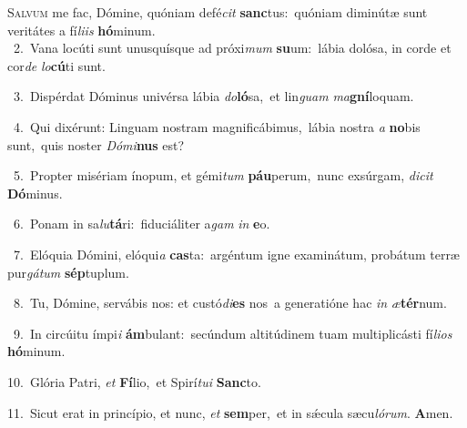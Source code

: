 \lettrine{\initial\textcolor{\initialcolor}{S}}{alvum} me fac, Dómine, quóniam defé\textit{cit} \textbf{sanc}\-tus:~\star quóniam diminútæ sunt veritátes a fí\-\textit{li}\-\textit{is} \textbf{hó}\-minum.\\
{\numbfont\textcolor{\numbcolor}{~2.}}~Vana locúti sunt unusquísque ad próxi\textit{mum} \textbf{su}\-um:~\star lábia dolósa, in corde et cor\textit{de} \textit{lo}\-\textbf{cú}ti sunt.\par
{\numbfont\textcolor{\numbcolor}{~3.}}~Dispérdat Dóminus univérsa lábia \textit{do}\-\textbf{ló}sa,~\star et lin\textit{guam} \textit{ma}\-\textbf{gní}loquam.\par
{\numbfont\textcolor{\numbcolor}{~4.}}~Qui dixérunt: Linguam nostram magnificábimus,~\dagger lábia nostra \textit{a} \textbf{no}\-bis sunt,~\star quis noster \textit{Dó}\-\textit{mi}\textbf{nus} est?\par
{\numbfont\textcolor{\numbcolor}{~5.}}~Propter misériam ínopum, et gémi\textit{tum} \textbf{páu}\-perum,~\star nunc exsúrgam, \textit{di}\-\textit{cit} \textbf{Dó}\-minus.\par
{\numbfont\textcolor{\numbcolor}{~6.}}~Ponam in sa\-\textit{lu}\-\textbf{tá}ri:~\star fiduciáliter a\textit{gam} \textit{in} \textbf{e}\-o.\par
{\numbfont\textcolor{\numbcolor}{~7.}}~Elóquia Dómini, elóqui\textit{a} \textbf{cas}\-ta:~\star argéntum igne examinátum, probátum terræ pur\-\textit{gá}\-\textit{tum} \textbf{sép}\-tuplum.\par
{\numbfont\textcolor{\numbcolor}{~8.}}~Tu, Dómine, servábis nos: et custó\-\textit{di}\-\textbf{es} nos~\star a generatióne hac \textit{in} \textit{æ}\-\textbf{tér}num.\par
{\numbfont\textcolor{\numbcolor}{~9.}}~In circúitu ímpi\textit{i} \textbf{ám}\-bulant:~\star secúndum altitúdinem tuam multiplicásti fí\-\textit{li}\-\textit{os} \textbf{hó}\-minum.\par
{\numbfont\textcolor{\numbcolor}{10.}}~Glória Patri, \textit{et} \textbf{Fí}\-lio,~\star et Spirí\-\textit{tu}\-\textit{i} \textbf{Sanc}\-to.\par
{\numbfont\textcolor{\numbcolor}{11.}}~Sicut erat in princípio, et nunc, \textit{et} \textbf{sem}\-per,~\star et in sǽcula sæcu\-\textit{ló}\-\textit{rum}. \textbf{A}\-men.\par
